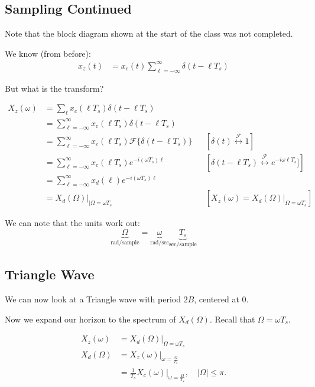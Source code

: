 \hrulefill

\subsection{Sampling Continued}
Note that the block diagram shown at the start of the class was not completed.

We know (from before):
\begin{align*}
    x_z(t) 
    &= x_c(t) \sum_{\ell=-\infty}^\infty \delta(t-\ell T_s)
\end{align*}
\begin{shaded}
But what is the transform?
\end{shaded}
\begin{align*}
    X_z(\omega) 
    &= \sum_{\ell} x_c(\ell T_s) \delta(t-\ell T_s)
    \\
    &=\sum_{\ell=-\infty}^\infty x_c(\ell T_s) \delta(t-\ell T_s)
    \\
    &=\sum_{\ell=-\infty}^\infty x_c(\ell T_s) \mathcal F\{\delta(t-\ell T_s)\}
    &&\left[\delta(t)\stackrel{\mathcal F}{\leftrightarrow}1\right]
    \\
    &=\sum_{\ell=-\infty}^\infty x_c(\ell T_s) e^{-i(\omega T_s)\ell}
    &&\left[\delta(t-\ell T_s)\stackrel{\mathcal F}{\leftrightarrow}e^{-i\omega\ell T_s}]\right]
    \\
    &=\sum_{\ell=-\infty}^\infty x_d(\ell) e^{-i(\omega T_s)\ell}
    \\
    &=
    X_d(\Omega)\Big|_{|\Omega = \omega T_s}
    &&\left[X_z(\omega)=X_d(\Omega)\Big|_{\Omega=\omega T_s}\right]
\end{align*}

We can note that the units work out:
\[
    \underbrace{\Omega}_{\text{rad/sample}} = \underbrace{\omega}_{\text{rad/sec}}
    \underbrace{T_s}_{\text{sec/sample}}
\]

\hrulefill
\subsection{Triangle Wave}

We can now look at a Triangle wave with period $2B$, centered at $0$.

Now we expand our horizon to the spectrum of $X_d(\Omega)$. Recall that $\Omega=\omega T_s$.

\begin{align*}
    X_z(\omega)
    &=
    X_d(\Omega)\Big|_{\Omega=\omega T_s}
    \\
    X_d(\Omega)
    &=
    X_z(\omega)\Big|_{\omega=\frac\Omega{T_s}}
    \\
    &=
    \frac1{T_s} X_c(\omega) \Big|_{\omega=\frac\Omega{T_s}},\quad|\Omega|\leq\pi.
\end{align*}

